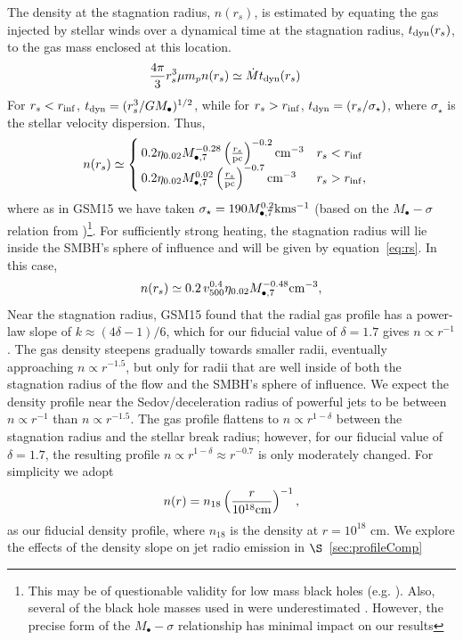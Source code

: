 \documentclass[usenatbib,fleqn]{mnras}
\newcommand{\Mbh}[1][]{M_{\bullet#1}}
\newcommand{\rs}{r_s}
\begin{document}
The density at the stagnation radius, $n(\rs)$, is estimated by
equating the gas injected by stellar winds over a dynamical time at
the stagnation radius, $t_{\rm dyn} (\rs)$, to
the gas mass enclosed at this location.  
\begin{align}
  &\frac{4 \pi}{3} \rs^3 \mu m_p n(r_s) \simeq \dot{M} t_{\rm dyn}
  (\rs)
\end{align}
%
For $\rs<r_{\rm inf}$, $t_{\rm dyn}=(\rs^3/G \Mbh)^{1/2}$, while for
$\rs>r_{\rm inf}$, $t_{\rm dyn}=(\rs/\sigma_\star)$, where
$\sigma_\star$ is the stellar velocity dispersion. Thus,
\begin{align}
  & n(r_s) \simeq
\begin{cases}
0.2 \eta_{0.02} \Mbh[,7]^{-0.28}
  \left(\frac{r_s}{\rm pc}\right)^{-0.2} {\rm cm}^{-3} & \rs<r_{\rm
    inf}\\
0.2 \eta_{0.02} \Mbh[,7]^{0.02} \left(\frac{r_s}{\rm pc}\right)^{-0.7}
{\rm cm}^{-3} & \rs>r_{\rm
    inf},
\end{cases}
\label{eq:nrs}
\end{align}
%
where as in GSM15 we have taken $\sigma_\star=190 \Mbh[,7]^{0.2} {\rm
  km s^{-1}}$ (based on the $\Mbh-\sigma$ relation from
\citealt{McConnell+2011})\footnote{This may be of questionable
  validity for low mass black holes
  (e.g. \citealt{Kormendy&Ho2013}). Also, several of the black hole
  masses used in \citet{McConnell+2011} were underestimated
  \citep{Kormendy&Ho2013}. However, the precise form of the
  $\Mbh-\sigma$ relationship has minimal impact on our results}. For
sufficiently strong heating, the stagnation radius will lie inside the
SMBH's sphere of influence and will be given by
equation~\eqref{eq:rs}. In this case,
\begin{equation}
n(r_s) \simeq 0.2 \, v_{500}^{0.4} \eta_{0.02} \Mbh[,7]^{-0.48} {\rm cm}^{-3},
\label{eq:nrs2}
\end{equation}
%
Near the stagnation radius, GSM15 found that the radial gas profile
has a power-law slope of $k \approx (4\delta-1)/6$, which for our
fiducial value of $\delta=1.7$ gives $n \propto r^{-1}$. The gas
density steepens gradually towards smaller radii, eventually
approaching $n\propto r^{-1.5}$, but only for radii that are well
inside of both the stagnation radius of the flow and the SMBH's sphere
of influence. We expect the density profile near the
Sedov/deceleration radius of powerful jets to be between $n\propto
r^{-1}$ than $n\propto r^{-1.5}$. The gas profile flattens to
$n\propto r^{1-\delta}$ between the stagnation radius and the stellar
break radius; however, for our fiducial value of $\delta = 1.7$, the
resulting profile $n\propto r^{1-\delta} \approx r^{-0.7}$ is only
moderately changed. For simplicity we adopt
\begin{equation} n(r)= n_{18} \left(\frac{r}{10^{18}
    {\rm cm}}\right)^{-1},
\label{eq:profile}
\end{equation}
as our fiducial density profile, where $n_{18}$ is the density at $r =
10^{18}$ cm. We explore the effects of the density slope on jet radio
emission in $\S$~\ref{sec:profileComp}
\end{document}
